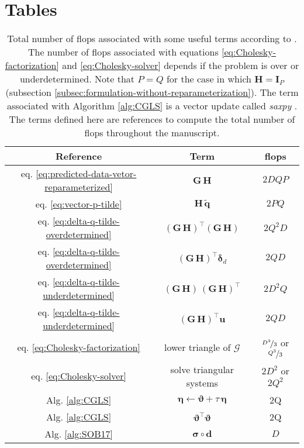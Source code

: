 \section{Tables}

\begin{table}[h!]
	\centering
	\begin{tabular}{c c c}
		Reference & Term & flops \\
		\hline
		eq. \ref{eq:predicted-data-vetor-reparameterized} & $\mathbf{G \, H}$ & $2DQP$ \\
		eq. \ref{eq:vector-p-tilde} & $\mathbf{H} \, \tilde{\mathbf{q}}$ & $2PQ$ \\
		eq. \ref{eq:delta-q-tilde-overdetermined} & $\left(\mathbf{G \, H}\right)^{\top}\left(\mathbf{G \, H}\right)$ & $2Q^{2}D$ \\
		eq. \ref{eq:delta-q-tilde-overdetermined} & $\left(\mathbf{G \, H}\right)^{\top}\boldsymbol{\delta}_{d} $ & $2QD$ \\
		eq. \ref{eq:delta-q-tilde-underdetermined} & $\left(\mathbf{G \, H}\right) \, \left(\mathbf{G \, H}\right)^{\top}$ & $2D^{2}Q$ \\
		eq. \ref{eq:delta-q-tilde-underdetermined} & $\left(\mathbf{G \, H}\right)^{\top}\mathbf{u}$ & $2QD$ \\
		eq. \ref{eq:Cholesky-factorization} & lower triangle of $\boldsymbol{\mathcal{G}}$ & $\nicefrac{D^{3}}{3}$ or $\nicefrac{Q^{3}}{3}$ \\
		eq. \ref{eq:Cholesky-solver} & solve triangular systems & $2D^{2}$ or $2Q^{2}$ \\
		Alg. \ref{alg:CGLS} & $\boldsymbol{\eta} \gets \boldsymbol{\vartheta} + \tau \, \boldsymbol{\eta}$ & 2Q \\
		Alg. \ref{alg:CGLS} & $\boldsymbol{\vartheta}^{\top} \boldsymbol{\vartheta}$ & 2Q \\
		Alg. \ref{alg:SOB17} & $\boldsymbol{\sigma} \circ \mathbf{d}$ & $D$ \\
	\end{tabular}
	\caption{
		Total number of flops associated with some useful terms according to \citet[][p. 12]{golub-vanloan2013}.
		The number of flops associated with equations \ref{eq:Cholesky-factorization} and \ref{eq:Cholesky-solver} 
		depends if the problem is over or underdetermined.
		Note that $P = Q$ for the case in which $\mathbf{H} = \mathbf{I}_{P}$ (subsection \ref{subsec:formulation-without-reparameterization}).
		The term associated with Algorithm \ref{alg:CGLS} is a vector update called \textit{saxpy} \citep[][p. 4]{golub-vanloan2013}.
		The terms defined here are references to compute the total number of flops throughout the manuscript.
	}
	\label{tab:standard-flops}
\end{table}

